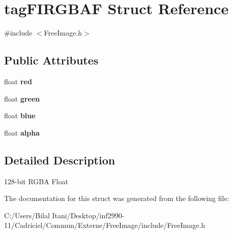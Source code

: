 \hypertarget{structtag_f_i_r_g_b_a_f}{}\section{tag\+F\+I\+R\+G\+B\+AF Struct Reference}
\label{structtag_f_i_r_g_b_a_f}


{\ttfamily \#include $<$Free\+Image.\+h$>$}

\subsection*{Public Attributes}
\begin{DoxyCompactItemize}
\item 
float {\bfseries red}\hypertarget{structtag_f_i_r_g_b_a_f_a59e5260e2f6e013661bc5d4775b18d9e}{}\label{structtag_f_i_r_g_b_a_f_a59e5260e2f6e013661bc5d4775b18d9e}

\item 
float {\bfseries green}\hypertarget{structtag_f_i_r_g_b_a_f_ac4e284e0711fdba31b624cee92d85e2b}{}\label{structtag_f_i_r_g_b_a_f_ac4e284e0711fdba31b624cee92d85e2b}

\item 
float {\bfseries blue}\hypertarget{structtag_f_i_r_g_b_a_f_a9c2e5ec45c4c33518fd4765f5fd04b01}{}\label{structtag_f_i_r_g_b_a_f_a9c2e5ec45c4c33518fd4765f5fd04b01}

\item 
float {\bfseries alpha}\hypertarget{structtag_f_i_r_g_b_a_f_a59da6fdc089e6ad1f8b2be601815f5cb}{}\label{structtag_f_i_r_g_b_a_f_a59da6fdc089e6ad1f8b2be601815f5cb}

\end{DoxyCompactItemize}


\subsection{Detailed Description}
128-\/bit R\+G\+BA Float 

The documentation for this struct was generated from the following file\+:\begin{DoxyCompactItemize}
\item 
C\+:/\+Users/\+Bilal Itani/\+Desktop/inf2990-\/11/\+Cadriciel/\+Commun/\+Externe/\+Free\+Image/include/Free\+Image.\+h\end{DoxyCompactItemize}
